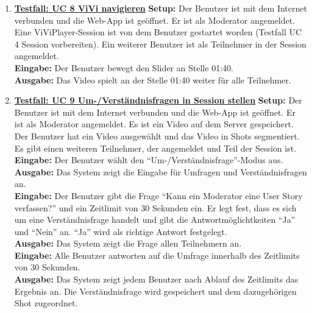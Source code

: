 \begin{enumerate}
	\item \underline{\textbf{Testfall: UC 8 ViVi navigieren}} \linebreak
	\textbf{Setup:} Der Benutzer ist mit dem Internet verbunden und die Web-App ist geöffnet. Er ist als Moderator angemeldet. Eine ViViPlayer-Session ist von dem Benutzer gestartet worden (Testfall UC 4 Session vorbereiten). Ein weiterer Benutzer ist als Teilnehmer in der Session angemeldet. \\
	\textbf{Eingabe:} Der Benutzer bewegt den Slider an Stelle 01:40. \\
	\textbf{Ausgabe:} Das Video spielt an der Stelle 01:40 weiter für alle Teilnehmer.\\
	
	\item \underline{\textbf{Testfall: UC 9 Um-/Verständnisfragen in Session stellen}} \linebreak
	\textbf{Setup:} Der Benutzer ist mit dem Internet verbunden und die Web-App ist geöffnet. Er ist als Moderator angemeldet. Es ist ein Video auf dem Server gespeichert. Der Benutzer hat ein Video ausgewählt und das Video in Shots segmentiert. Es gibt einen weiteren Teilnehmer, der angemeldet und Teil der Session ist.\\
	\textbf{Eingabe:} Der Benutzer wählt den ``Um-/Verständnisfrage''-Modus aus. \\
	\textbf{Ausgabe:} Das System zeigt die Eingabe für Umfragen und Verständnisfragen an.\\ 
	\textbf{Eingabe:} Der Benutzer gibt die Frage ``Kann ein Moderator eine User Story verfassen?'' und ein Zeitlimit von 30 Sekunden ein. Er legt fest, dass es sich um eine Verständnisfrage handelt und gibt die Antwortmöglichtkeiten ``Ja'' und ``Nein'' an. ``Ja'' wird als richtige Antwort festgelegt.\\
	\textbf{Ausgabe:} Das System zeigt die Frage allen Teilnehmern an.\\ 
	\textbf{Eingabe:} Alle Benutzer antworten auf die Umfrage innerhalb des Zeitlimits von 30 Sekunden. \\
	\textbf{Ausgabe:} Das System zeigt jedem Benutzer nach Ablauf des Zeitlimits das Ergebnis an. Die Verständnisfrage wird gespeichert und dem dazugehörigen Shot zugeordnet. \\
	

\end{enumerate}
